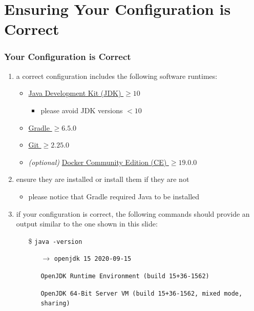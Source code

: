\documentclass[handout]{beamer}\mode<presentation>{\usetheme{AMSCesenaPurpleAndGold}}
\begin{document}
\section{Ensuring Your Configuration is Correct}

\begin{frame}[c,allowframebreaks]
\frametitle{Your Configuration is Correct}

	\begin{enumerate}

    \item a correct configuration includes the following software runtimes:
    \begin{itemize}
        \item \href{https://www.oracle.com/java/technologies/javase-jdk15-downloads.html}{Java Development Kit (JDK) $\geq 10$} 
		\begin{itemize}
			\item \alert{please avoid JDK versions $< 10$}
		\end{itemize}
        \item \href{https://gradle.org/releases}{Gradle $\geq 6.5.0$}
        \item \href{https://git-scm.com}{Git $\geq 2.25.0$}
    	\item \emph{(optional)} \href{https://www.docker.com/products/docker-desktop}{Docker Community Edition (CE) $\geq 19.0.0$}
    \end{itemize}

	\item ensure they are installed or install them if they are not
	\begin{itemize}
		\item please notice that Gradle required Java to be installed
	\end{itemize}
    
    \framebreak
    
    \item if your configuration is correct, the following commands should provide an output similar to the one shown in this slide:
    \begin{itemize}
        \item[\$] \texttt{java -version}
        \begin{itemize}
            \item[$\rightarrow$] \texttt{openjdk 15 2020-09-15}
            \item[] \texttt{OpenJDK Runtime Environment (build 15+36-1562)}
            \item[] \texttt{OpenJDK 64-Bit Server VM (build 15+36-1562, mixed mode, sharing)}
        \end{itemize}
        

\end{itemize}
\end{enumerate}
\end{frame}
\end{document}
